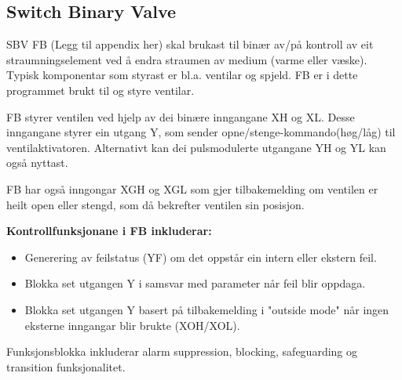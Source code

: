 \newpage

\subsection{Switch Binary Valve}

\gls{SBV} \gls{FB} (Legg til appendix her) skal brukast til binær av/på kontroll av eit straumningselement ved å endra straumen av medium (varme eller væske). 
Typisk komponentar som styrast er bl.a. ventilar og spjeld.
\gls{FB} er i dette programmet brukt til og styre ventilar.

\gls{FB} styrer ventilen ved hjelp av dei binære inngangane XH og XL.
Desse inngangane styrer ein utgang Y, som sender opne/stenge-kommando(høg/låg) til ventilaktivatoren.
Alternativt kan dei pulsmodulerte utgangane YH og YL kan også nyttast.

\gls{FB} har også inngongar XGH og XGL som gjer tilbakemelding om ventilen er heilt open eller stengd,
som då bekrefter ventilen sin posisjon.

\textbf{Kontrollfunksjonane i \gls{FB} inkluderar:}
\begin{itemize}
    \item Generering av feilstatus (YF) om det oppstår ein intern eller ekstern feil.
    \item Blokka set utgangen Y i samsvar med parameter når feil blir oppdaga.
    \item Blokka set utgangen Y basert på tilbakemelding i "outside mode" når ingen eksterne inngangar blir brukte (XOH/XOL).
\end{itemize}

Funksjonsblokka inkluderar alarm suppression, blocking, safeguarding og transition funksjonalitet.

